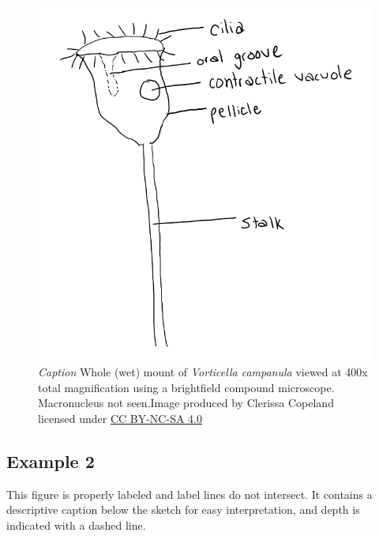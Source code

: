 \documentclass[
]{book}
\begin{document}
\begin{figure}
\centering
\includegraphics{images/JSSG_good-journal-style-fig-1.png}
\caption{\emph{Caption} Whole (wet) mount of \emph{Vorticella campanula} viewed at 400x total magnification using a brightfield compound microscope. Macronucleus not seen.Image produced by Clerissa Copeland licensed under \href{https://creativecommons.org/licenses/by-nc-sa/4.0/}{CC BY-NC-SA 4.0}}
\end{figure}

\hypertarget{example-2}{%
\subsection*{Example 2}\label{example-2}}

This figure is properly labeled and label lines do not intersect. It contains a descriptive caption below the sketch for easy interpretation, and depth is indicated with a dashed line.
\end{document}
